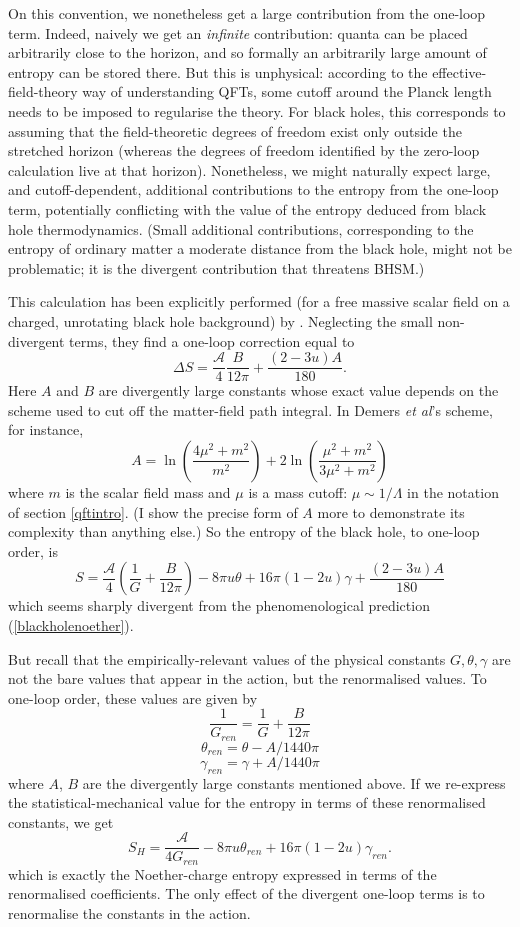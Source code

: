 \documentclass[12pt]{article}
\newcommand{\mc}[1]{\ensuremath{\mathcal{#1}}}
\newcommand{\be}{\begin{equation}}
\newcommand{\ee}{\end{equation}}
\begin{document}
On this convention, we nonetheless get a large contribution from the one-loop term. Indeed, naively we get an \emph{infinite} contribution: quanta can be placed arbitrarily close to the horizon, and so formally an arbitrarily large amount of entropy can be stored there. But this is unphysical: according to the effective-field-theory way of understanding QFTs, some cutoff around the Planck length needs to be imposed to regularise the theory. For black holes, this corresponds to assuming that the field-theoretic degrees of freedom exist only outside the stretched horizon (whereas the degrees of freedom identified by the zero-loop calculation live at that horizon). Nonetheless, we might naturally expect large, and cutoff-dependent, additional contributions to the entropy from the one-loop term, potentially conflicting with the value of the entropy deduced from black hole thermodynamics. (Small additional contributions, corresponding to the entropy of ordinary matter a moderate distance from the black hole, might not be problematic; it is the divergent contribution that threatens BHSM.)

This calculation has been explicitly performed (for a free massive scalar field on a charged, unrotating black hole background) by . Neglecting the small non-divergent terms, they find a one-loop correction equal to
\be
\Delta S=\frac{\mc{A}}{4}\frac{B}{12\pi} + \frac{(2-3u)A}{180}.
\ee
Here $A$ and $B$ are divergently large constants whose exact value depends on the scheme used to cut off the matter-field path integral. In Demers \emph{et al}'s scheme, for instance, 
\be 
A = \ln \left(\frac{4 \mu^2 + m^2}{m^2}\right) + 2 \ln \left(\frac{\mu^2 + m^2}{3\mu^2 + m^2}\right)
\ee
where $m$ is the scalar field mass and $\mu$ is a mass cutoff: $\mu \sim 1/\Lambda$ in the notation of section \ref{qftintro}. (I show the precise form of $A$ more to demonstrate its complexity than anything else.) So the entropy of the black hole, to one-loop order, is
\be
S = \frac{\mc{A}}{4}\left(\frac{1}{G}+\frac{B}{12\pi} \right) - 8\pi u \theta + 16 \pi(1-2u)\gamma  + \frac{(2-3u)A}{180}
\ee
which seems sharply divergent from the phenomenological prediction (\ref{blackholenoether}).

But recall that the empirically-relevant values of the physical constants $G,\theta,\gamma$ are not the bare values that appear in the action, but the renormalised values. To one-loop order, these values are given by
\[
\frac{1}{G_{ren}} = \frac{1}{G}+ \frac{B}{12\pi}
\]
\[
\theta_{ren} = \theta - A/1440\pi \] \be\gamma_{ren} = \gamma + A/1440\pi \ee where $A$, $B$ are the divergently large constants mentioned above. If we re-express the statistical-mechanical value for the entropy in terms of these renormalised constants, we get
\be
S_H = \frac{\mc{A}}{4 G_{ren}} - 8 \pi u \theta_{ren} + 16\pi  (1-2u) \gamma_{ren}.
\ee
which is exactly the Noether-charge entropy expressed in terms of the renormalised coefficients. The only effect of the divergent one-loop terms is to renormalise the constants in the action.
\end{document}
